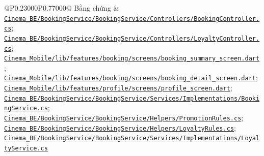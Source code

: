 \begin{longtable}{@{}P{0.23000\SRSWidth}P{0.77000\SRSWidth}@{}}
Bằng chứng & \href{../../../Cinema\_BE/BookingService/BookingService/Controllers/BookingController.cs}{\texttt{Cinema\_\allowbreak{}BE/\allowbreak{}Booking\allowbreak{}Service/\allowbreak{}Booking\allowbreak{}Service/\allowbreak{}Controll\allowbreak{}ers/\allowbreak{}Booking\allowbreak{}Controll\allowbreak{}er.\allowbreak{}cs}}; \href{../../../Cinema\_BE/BookingService/BookingService/Controllers/LoyaltyController.cs}{\texttt{Cinema\_\allowbreak{}BE/\allowbreak{}Booking\allowbreak{}Service/\allowbreak{}Booking\allowbreak{}Service/\allowbreak{}Controll\allowbreak{}ers/\allowbreak{}Loyalty\allowbreak{}Controll\allowbreak{}er.\allowbreak{}cs}}; \href{../../../Cinema\_Mobile/lib/features/booking/screens/booking\_summary\_screen.dart}{\texttt{Cinema\_\allowbreak{}Mobile/\allowbreak{}lib/\allowbreak{}features\allowbreak{}/\allowbreak{}booking/\allowbreak{}screens/\allowbreak{}booking\_\allowbreak{}summary\_\allowbreak{}screen.\allowbreak{}dart}}; \href{../../../Cinema\_Mobile/lib/features/booking/screens/booking\_detail\_screen.dart}{\texttt{Cinema\_\allowbreak{}Mobile/\allowbreak{}lib/\allowbreak{}features\allowbreak{}/\allowbreak{}booking/\allowbreak{}screens/\allowbreak{}booking\_\allowbreak{}detail\_\allowbreak{}screen.\allowbreak{}dart}}; \href{../../../Cinema\_Mobile/lib/features/profile/screens/profile\_screen.dart}{\texttt{Cinema\_\allowbreak{}Mobile/\allowbreak{}lib/\allowbreak{}features\allowbreak{}/\allowbreak{}profile/\allowbreak{}screens/\allowbreak{}profile\_\allowbreak{}screen.\allowbreak{}dart}}; \href{../../../Cinema\_BE/BookingService/BookingService/Services/Implementations/BookingService.cs}{\texttt{Cinema\_\allowbreak{}BE/\allowbreak{}Booking\allowbreak{}Service/\allowbreak{}Booking\allowbreak{}Service/\allowbreak{}Services\allowbreak{}/\allowbreak{}Implemen\allowbreak{}tations/\allowbreak{}Booking\allowbreak{}Service.\allowbreak{}cs}}; \href{../../../Cinema\_BE/BookingService/BookingService/Helpers/PromotionRules.cs}{\texttt{Cinema\_\allowbreak{}BE/\allowbreak{}Booking\allowbreak{}Service/\allowbreak{}Booking\allowbreak{}Service/\allowbreak{}Helpers/\allowbreak{}Promotio\allowbreak{}n\allowbreak{}Rules.\allowbreak{}cs}}; \href{../../../Cinema\_BE/BookingService/BookingService/Helpers/LoyaltyRules.cs}{\texttt{Cinema\_\allowbreak{}BE/\allowbreak{}Booking\allowbreak{}Service/\allowbreak{}Booking\allowbreak{}Service/\allowbreak{}Helpers/\allowbreak{}Loyalty\allowbreak{}Rules.\allowbreak{}cs}}; \href{../../../Cinema\_BE/BookingService/BookingService/Services/Implementations/LoyaltyService.cs}{\texttt{Cinema\_\allowbreak{}BE/\allowbreak{}Booking\allowbreak{}Service/\allowbreak{}Booking\allowbreak{}Service/\allowbreak{}Services\allowbreak{}/\allowbreak{}Implemen\allowbreak{}tations/\allowbreak{}Loyalty\allowbreak{}Service.\allowbreak{}cs}} \\[3pt]

\end{longtable}
